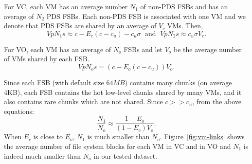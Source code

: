 For VC, each VM has an average number $N_1$ of non-PDS FSBs
and  has  an average of  $N_2$ PDS FSBs. 
Each non-PDS FSB is associated with one VM
 and  we denote that PDS FSBs are
shared by an average of $V_c$ VMs. 
Then, 
\[
V pN_1 s  \approx c-E_c(c-c_u) - c_u\sigma\; \mbox{ and } \; 
V pN_2 s  \approx c_u \sigma V_c.
\]

For VO, each VM has an average of $N_o$ FSBs
and let $V_o$ be the average number of VMs shared by each FSB.
\[
V pN_o s  = (c- E_o(c-c_u) ) V_o.
\]

Since each FSB (with default size $64MB$) contains many chunks (on average 4KB),
each FSB contains the hot low-level chunks shared by many VMs, and it also contains
rare chunks which are not shared.  Since $c>> c_u$, from the above equations:
\[
\frac{N_1}{N_o} \approx  \frac{1-E_o}{(1-E_c) V_o}.
\] 
When $E_c$ is close to $E_o$,
$N_1$ is much smaller than $N_o$. 
Figure~\ref{fig:vm-links} shows the average number of file system blocks for each VM in VC and in VO
and  $N_1$ is indeed  much smaller than $N_o$ in our tested dataset.  


